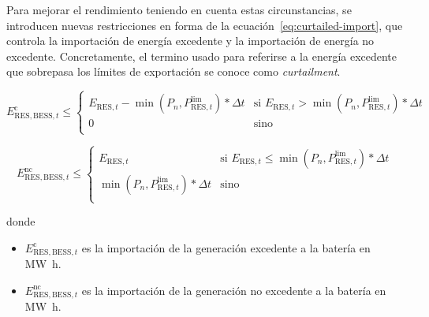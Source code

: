 Para mejorar el rendimiento teniendo en cuenta estas circunstancias, se introducen nuevas restricciones en forma de la ecuación~\ref{eq:curtailed-import}, que controla la importación de energía excedente y la importación de energía no excedente. Concretamente, el termino usado para referirse a la energía excedente que sobrepasa los límites de exportación se conoce como \textit{curtailment}.

\begin{samepage}%
  \label{eq:curtailed-import}

  \begin{equation}%
    E^{\text{c}}_{\text{RES}, \text{BESS}, t} \le
    \begin{cases}
      E_{\text{RES}, t} - \min(P_{n}, P^{\text{lim}}_{\text{RES}, t}) * \Delta t & \text{si } E_{\text{RES}, t} > \min(P_{n}, P^{\text{lim}}_{\text{RES}, t}) * \Delta t \\
      0                                                                          & \text{sino} \\
    \end{cases}
  \end{equation}

  \begin{equation}%
    E^{\text{nc}}_{\text{RES}, \text{BESS}, t} \le
    \begin{cases}
      E_{\text{RES}, t}                                      & \text{si } E_{\text{RES}, t} \le \min(P_{n}, P^{\text{lim}}_{\text{RES}, t}) * \Delta t \\
      \min(P_{n}, P^{\text{lim}}_{\text{RES}, t}) * \Delta t & \text{sino} \\
    \end{cases}
  \end{equation}

  donde

  \begin{itemize}

    \item \( E^{\text{c}}_{\text{RES}, \text{BESS}, t} \) es la importación de la generación excedente a la batería en \si{{\mega\watt\hour}}.

    \item \( E^{\text{nc}}_{\text{RES}, \text{BESS}, t} \) es la importación de la generación no excedente a la batería en \si{{\mega\watt\hour}}.

  \end{itemize}

\end{samepage}

